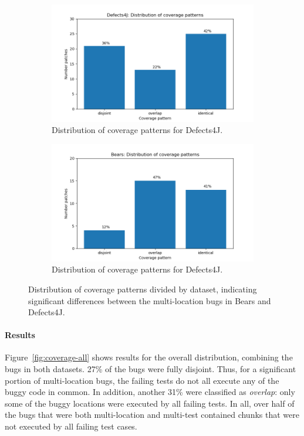 \begin{figure}
	\begin{subfigure}{\linewidth}
		\includegraphics[width=\linewidth]{img/coverage-d4j.png}
		\caption{Distribution of coverage patterns for Defects4J.}
	\end{subfigure}
	\begin{subfigure}{\linewidth}
		\includegraphics[width=\linewidth]{img/coverage-bears.png}
		\caption{Distribution of coverage patterns for Defects4J.}
	\end{subfigure}
	\caption{Distribution of coverage patterns divided by dataset,
          indicating significant differences between the multi-location bugs in
          Bears and Defects4J.}
	\label{fig:coverage-datasets}
\end{figure}

\paragraph{Results}
Figure~\ref{fig:coverage-all} shows results for the overall distribution,
combining the bugs in both datasets. 27\%
of the bugs were fully disjoint.  Thus, for a significant portion of multi-location bugs,
the failing tests do not all execute any of the buggy code in common.  
In addition, another 31\% were classified as \emph{overlap}: only some of the
buggy locations were executed by all failing tests. In all, over half of 
the bugs that were both multi-location and multi-test contained chunks that were 
not executed by all failing test cases.

